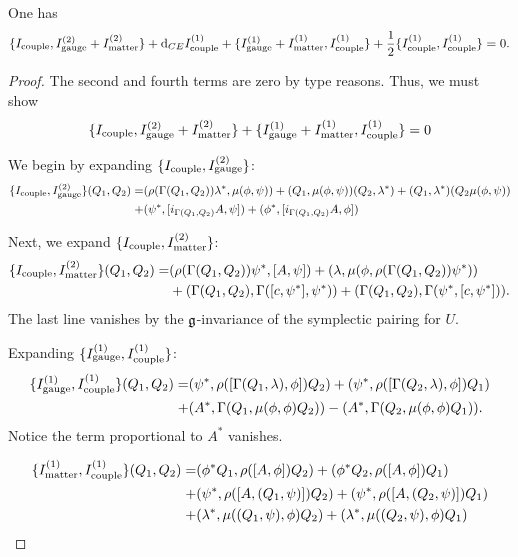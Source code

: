\documentclass[10pt, oneside]{article}
\begin{document}
\begin{lem}
One has
\[
\{I_{\rm couple}, I^{(2)}_{\rm gauge} + I^{(2)}_{\rm matter}\} + {\rm d}_{CE} I^{(1)}_{\rm couple} + \{I^{(1)}_{\rm gauge} + I^{(1)}_{\rm matter}, I^{(1)}_{\rm couple}\} + \frac{1}{2} \{I_{\rm couple}^{(1)}, I_{\rm couple}^{(1)}\} =  0.
\]
\end{lem}
\begin{proof}
The second and fourth terms are zero by type reasons.
Thus, we must show
\begin{equation}\label{CMEcouple2}
\{I_{\rm couple}, I^{(2)}_{\rm gauge} + I^{(2)}_{\rm matter}\} +  \{I^{(1)}_{\rm gauge} + I^{(1)}_{\rm matter}, I^{(1)}_{\rm couple}\} = 0
\end{equation}

We begin by expanding $\{I_{\rm couple}, I^{(2)}_{\rm gauge}\}$:
\begin{align*}
\{I_{\rm couple}, I^{(2)}_{\rm gauge}\} (Q_1,Q_2) = & (\rho(\Gamma(Q_1,Q_2)) \lambda^*, \mu(\phi,\psi)) + (Q_1, \mu(\phi, \psi)) (Q_2, \lambda^*) + (Q_1, \lambda^*)(Q_2 \mu(\phi,\psi)) \\ + & (\psi^*, [i_{\Gamma(Q_1,Q_2)} A , \psi]) + (\phi^*, [i_{\Gamma(Q_1,Q_2)} A , \phi])
\end{align*}

Next, we expand $\{I_{\rm couple}, I^{(2)}_{\rm matter}\}$:
\begin{align*}
\{I_{\rm couple}, I^{(2)}_{\rm matter}\} (Q_1,Q_2) = & (\rho(\Gamma(Q_1,Q_2)) \psi^*, [A, \psi]) + (\lambda, \mu(\phi, \rho(\Gamma(Q_1,Q_2)) \psi^*)) \\ & + (\Gamma(Q_1, Q_2), \Gamma([c, \psi^*], \psi^*)) + (\Gamma(Q_1, Q_2), \Gamma(\psi^*, [c, \psi^*])).
\end{align*} 
The last line vanishes by the $\mathfrak g$-invariance of the symplectic pairing for $U$. 

Expanding $\{I^{(1)}_{\rm gauge}, I^{(1)}_{\rm couple}\}$:
\begin{align*}
\{I^{(1)}_{\rm gauge}, I^{(1)}_{\rm couple}\}(Q_1,Q_2) = & (\psi^*, \rho([\Gamma(Q_1, \lambda), \phi]) Q_2) + (\psi^*, \rho([\Gamma(Q_2, \lambda), \phi]) Q_1) \\ + & (A^*, \Gamma(Q_1, \mu(\phi, \phi) Q_2)) - (A^*, \Gamma(Q_2, \mu(\phi, \phi) Q_1)) . 
\end{align*}
Notice the term proportional to $A^*$ vanishes. 

\begin{align*}
\{I^{(1)}_{\rm matter}, I^{(1)}_{\rm couple}\}  (Q_1,Q_2) = & (\phi^* Q_1 , \rho([A,\phi]) Q_2) + (\phi^* Q_2 , \rho([A,\phi]) Q_1) \\ + &  (\psi^*, \rho([A, (Q_1, \psi)]) Q_2) +  (\psi^*, \rho([A, (Q_2, \psi)]) Q_1) \\ + & (\lambda^*, \mu((Q_1, \psi), \phi) Q_2) +  (\lambda^*, \mu((Q_2, \psi), \phi) Q_1) 
\end{align*}


\end{proof}
\end{document}
